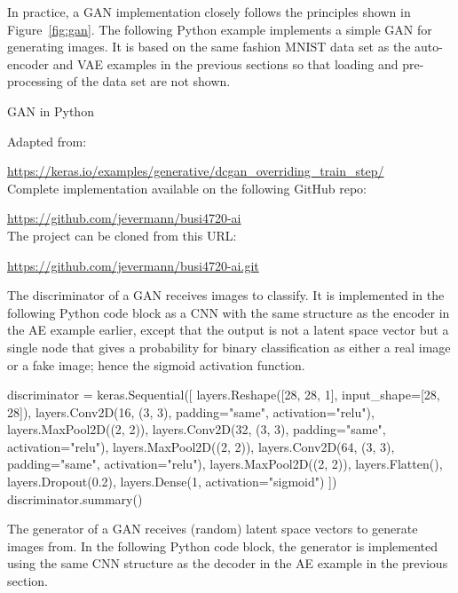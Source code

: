 \begin{withcode}
In practice, a GAN implementation closely follows the principles shown in Figure~\ref{fig:gan}. The following Python example implements a simple GAN for generating images. It is based on the same fashion MNIST data set as the auto-encoder and VAE examples in the previous sections so that loading and pre-processing of the data set are not shown.

\begin{resourcebox}{GAN in Python}

Adapted from: 

\small\url{https://keras.io/examples/generative/dcgan_overriding_train_step/}\normalsize \\

Complete implementation available on the following GitHub repo:

\small\url{https://github.com/jevermann/busi4720-ai}\normalsize \\

The project can be cloned from this URL:

\small\url{https://github.com/jevermann/busi4720-ai.git}\normalsize
\end{resourcebox}

The discriminator of a GAN receives images to classify. It is implemented in the following Python code block as a CNN with the same structure as the encoder in the AE example earlier, except that the output is not a latent space vector but a single node that gives a probability for binary classification as either a real image or a fake image; hence the sigmoid activation function.

\begin{pythoncode}
discriminator = keras.Sequential([
    layers.Reshape([28, 28, 1], input_shape=[28, 28]),
    layers.Conv2D(16, (3, 3), 
        padding="same", activation="relu"),
    layers.MaxPool2D((2, 2)),
    layers.Conv2D(32, (3, 3), 
        padding="same", activation="relu"),
    layers.MaxPool2D((2, 2)),
    layers.Conv2D(64, (3, 3), 
        padding="same", activation="relu"),
    layers.MaxPool2D((2, 2)),
    layers.Flatten(),
    layers.Dropout(0.2),
    layers.Dense(1, activation="sigmoid")
])
discriminator.summary()
\end{pythoncode}

The generator of a GAN receives (random) latent space vectors to generate images from. In the following Python code block, the generator is implemented using the same CNN structure as the decoder in the AE example in the previous section.


\end{withcode}
